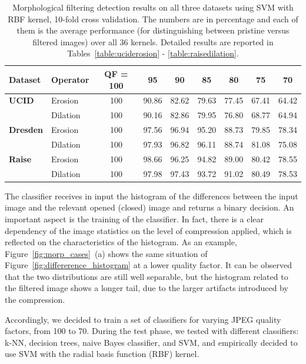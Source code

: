 \documentclass{ieeeaccess}
\begin{document}
\begin{table}[t!]
	\centering
	\caption{Morphological filtering detection results on all three datasets  using SVM with RBF kernel, 10-fold cross validation. The numbers are in percentage and each of them is the average performance (for distinguishing between pristine versus filtered images) over all 36 kernels. Detailed results are reported in Tables~\ref{table:uciderosion} - \ref{table:raisedilation}.}
	\label{table:detection_results}
	\begin{tabular}{l|l|ccccccc}
		\hline\hline
		\textbf{Dataset} & \textbf{Operator} & \textbf{QF = 100} & \textbf{95} & \textbf{90} & \textbf{85} & \textbf{80} & \textbf{75} & \textbf{70} \\
		\hline
		\textbf{UCID} & Erosion & 100 & 90.86 & 82.62 & 79.63 & 77.45 & 67.41 & 64.42 \\
		& Dilation & 100 & 90.16 & 82.86 & 79.95 & 76.80 & 68.77 & 64.94 \\
		\hline
		\textbf{Dresden} & Erosion & 100 & 97.56 & 96.94 & 95.20 & 88.73 & 79.85 & 78.34 \\
		& Dilation & 100 & 97.93 & 96.82 & 96.11 & 88.74 & 81.08 & 75.08 \\
		\hline
		\textbf{Raise} & Erosion & 100 & 98.66 & 96.25 & 94.82 & 89.00 & 80.42 & 78.55 \\
		& Dilation & 100 & 97.98 & 97.43 & 93.72 & 91.02 & 80.49 & 78.53 \\
		\hline\hline
	\end{tabular}%
\end{table}

The classifier receives in input the histogram of the differences between the input image and the relevant opened (closed) image and returns a binary decision. An important aspect is the training of the classifier. In fact, there is a clear dependency of the image statistics on the level of compression applied, which is reflected on the characteristics of the histogram. As an example, Figure~\ref{fig:morp_cases}~(a) shows the same situation of Figure~\ref{fig:differerence_histogram} at a lower quality factor. It can be observed that the two distributions are still well separable, but the histogram related to the filtered image shows a longer tail, due to the larger artifacts introduced by the compression.

Accordingly, we decided to train a set of classifiers for varying JPEG quality factors, from 100 to 70. During the test phase, we tested with different classifiers: k-NN, decision trees, naive Bayes classifier, and SVM, and empirically decided to use SVM with the radial basis function (RBF) kernel. 
\end{document}
